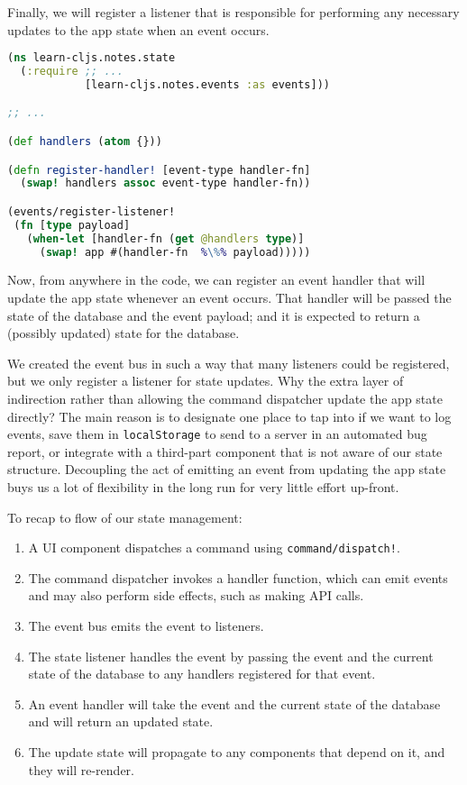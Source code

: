 \documentclass[10pt,twoside,openright]{memoir}
\begin{document}
Finally, we will register a listener that is responsible for performing
any necessary updates to the app state when an event occurs.

\begin{lstlisting}[language=Clojure, caption={notes/state.cljs}]
(ns learn-cljs.notes.state
  (:require ;; ...
            [learn-cljs.notes.events :as events]))

;; ...

(def handlers (atom {}))

(defn register-handler! [event-type handler-fn]
  (swap! handlers assoc event-type handler-fn))

(events/register-listener!
 (fn [type payload]
   (when-let [handler-fn (get @handlers type)]
     (swap! app #(handler-fn  %\%% payload)))))
\end{lstlisting}

Now, from anywhere in the code, we can register an event handler that
will update the app state whenever an event occurs. That handler will be
passed the state of the database and the event payload; and it is
expected to return a (possibly updated) state for the database.

We created the event bus in such a way that many listeners could be
registered, but we only register a listener for state updates. Why the
extra layer of indirection rather than allowing the command dispatcher
update the app state directly? The main reason is to designate one place
to tap into if we want to log events, save them in \texttt{localStorage}
to send to a server in an automated bug report, or integrate with a
third-part component that is not aware of our state structure.
Decoupling the act of emitting an event from updating the app state buys
us a lot of flexibility in the long run for very little effort up-front.

To recap to flow of our state management:

\begin{enumerate}
\def\labelenumi{\arabic{enumi}.}
\tightlist
\item
  A UI component dispatches a command using \texttt{command/dispatch!}.
\item
  The command dispatcher invokes a handler function, which can emit
  events and may also perform side effects, such as making API calls.
\item
  The event bus emits the event to listeners.
\item
  The state listener handles the event by passing the event and the
  current state of the database to any handlers registered for that
  event.
\item
  An event handler will take the event and the current state of the
  database and will return an updated state.
\item
  The update state will propagate to any components that depend on it,
  and they will re-render.
\end{enumerate}
\end{document}
